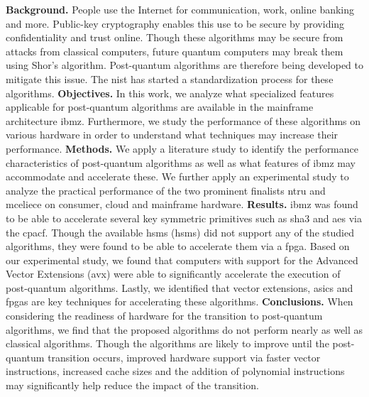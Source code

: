 \abstract
\noindent\textbf{Background.} People use the Internet for communication, work, online banking and more. Public-key cryptography enables this use to be secure by providing confidentiality and trust online. Though these algorithms may be secure from attacks from classical computers, future quantum computers may break them using Shor's algorithm. Post-quantum algorithms are therefore being developed to mitigate this issue. The \acrfull{nist} has started a standardization process for these algorithms.\newline
\textbf{Objectives.} In this work, we analyze what specialized features applicable for \gls{post-quantum} algorithms are available in the mainframe architecture \gls{ibmz}. Furthermore, we study the performance of these algorithms on various hardware in order to understand what techniques may increase their performance.\newline
\textbf{Methods.} We apply a literature study to identify the performance characteristics of \gls{post-quantum} algorithms as well as what features of \gls{ibmz} may accommodate and accelerate these. We further apply an experimental study to analyze the practical performance of the two prominent finalists \gls{ntru} and \gls{mceliece} on consumer, cloud and mainframe hardware.\newline
\textbf{Results.} \gls{ibmz} was found to be able to accelerate several key symmetric primitives such as \gls{sha3} and \gls{aes} via the \gls{cpacf}. Though the available \acrlong{hsm}s (\acrshort{hsm}s) did not support any of the studied algorithms, they were found to be able to accelerate them via a \gls{fpga}. Based on our experimental study, we found that computers with support for the Advanced Vector Extensions (\gls{avx}) were able to significantly accelerate the execution of \gls{post-quantum} algorithms. Lastly, we identified that vector extensions, \glspl{asic} and \glspl{fpga} are key techniques for accelerating these algorithms.\newline
\textbf{Conclusions.} When considering the readiness of hardware for the transition to \gls{post-quantum} algorithms, we find that the proposed algorithms do not perform nearly as well as classical algorithms. Though the algorithms are likely to improve until the \gls{post-quantum} transition occurs, improved hardware support via faster vector instructions, increased cache sizes and the addition of polynomial instructions may significantly help reduce the impact of the transition.

